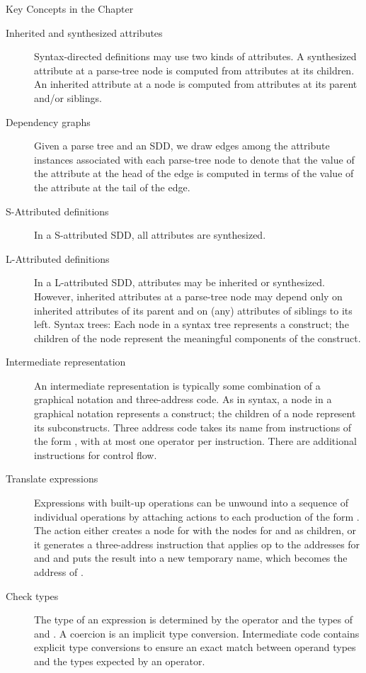 \begin{bibunit}[apalike]
\begin{frame}[t,allowframebreaks]{Key Concepts in the Chapter}
	\begin{description}
	\item[Inherited and synthesized attributes] Syntax-directed definitions may use two kinds of attributes. A synthesized attribute at a parse-tree node is computed from attributes at its children. An inherited attribute at a node is computed from attributes at its parent and/or siblings.
	\item[Dependency graphs] Given a parse tree and an SDD, we draw edges among the attribute instances associated with each parse-tree node to denote that the value of the attribute at the head of the edge is computed in terms of the value of the attribute at the tail of the edge.
	\item[S-Attributed definitions] In a S-attributed SDD, all attributes are synthesized.
	\item[L-Attributed definitions] In a L-attributed SDD, attributes may be inherited or synthesized. However, inherited attributes at a parse-tree node may depend only on inherited attributes of its parent and on (any) attributes of siblings to its left.
Syntax trees: Each node in a syntax tree represents a construct; the children of the node represent the meaningful components of the construct.
	\item[Intermediate representation] An intermediate representation is typically some combination of a graphical notation and three-address code. As in syntax, a node in a graphical notation represents a construct; the children of a node represent its subconstructs. Three address code takes its name from instructions of the form , with at most one operator per instruction. There are additional instructions for control flow.
	\item[Translate expressions] Expressions with built-up operations can be unwound into a sequence of individual operations by attaching actions to each production of the form . The action either creates a node for  with the nodes for  and  as children, or it generates a three-address instruction that applies op to the addresses for  and  and puts the result into a new temporary name, which becomes the address of .
	\item[Check types] The type of an expression  is determined by the operator  and the types of  and . A coercion is an implicit type conversion. Intermediate code contains explicit type conversions to ensure an exact match between operand types and the types expected by an operator.

\end{description}
\end{frame}
\end{bibunit}
